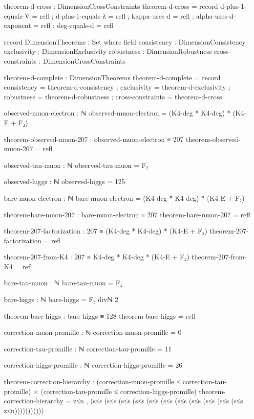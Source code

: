 \documentclass[11pt,a4paper]{book}
\begin{document}
\begin{code}
theorem-d-cross : DimensionCrossConstraints
theorem-d-cross = record
  { d-plus-1-equals-V     = refl
  ; d-plus-1-equals-λ     = refl
  ; kappa-uses-d          = refl
  ; alpha-uses-d-exponent = refl
  ; deg-equals-d          = refl
  }

record DimensionTheorems : Set where
  field
    consistency       : DimensionConsistency
    exclusivity       : DimensionExclusivity
    robustness        : DimensionRobustness
    cross-constraints : DimensionCrossConstraints

theorem-d-complete : DimensionTheorems
theorem-d-complete = record
  { consistency       = theorem-d-consistency
  ; exclusivity       = theorem-d-exclusivity
  ; robustness        = theorem-d-robustness
  ; cross-constraints = theorem-d-cross
  }


observed-muon-electron : ℕ
observed-muon-electron = (K4-deg * K4-deg) * (K4-E + F₂)

theorem-observed-muon-207 : observed-muon-electron ≡ 207
theorem-observed-muon-207 = refl

observed-tau-muon : ℕ
observed-tau-muon = F₂

observed-higgs : ℕ
observed-higgs = 125

bare-muon-electron : ℕ
bare-muon-electron = (K4-deg * K4-deg) * (K4-E + F₂)

theorem-bare-muon-207 : bare-muon-electron ≡ 207
theorem-bare-muon-207 = refl

theorem-207-factorization : 207 ≡ (K4-deg * K4-deg) * (K4-E + F₂)
theorem-207-factorization = refl

theorem-207-from-K4 : 207 ≡ K4-deg * K4-deg * (K4-E + F₂)
theorem-207-from-K4 = refl

bare-tau-muon : ℕ
bare-tau-muon = F₂

bare-higgs : ℕ
bare-higgs = F₃ divℕ 2

theorem-bare-higgs : bare-higgs ≡ 128
theorem-bare-higgs = refl

correction-muon-promille : ℕ
correction-muon-promille = 0

correction-tau-promille : ℕ
correction-tau-promille = 11

correction-higgs-promille : ℕ
correction-higgs-promille = 26

theorem-correction-hierarchy : (correction-muon-promille ≤ correction-tau-promille) × 
                                (correction-tau-promille ≤ correction-higgs-promille)
theorem-correction-hierarchy = z≤n , (s≤s (s≤s (s≤s (s≤s (s≤s (s≤s (s≤s (s≤s (s≤s (s≤s (s≤s z≤n)))))))))))


\end{code}
\end{document}

